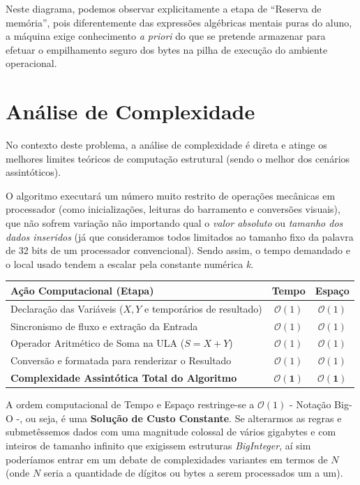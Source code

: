 \documentclass[11pt]{article}
\begin{document}
Neste diagrama, podemos observar explicitamente a etapa de ``Reserva de memória'', pois diferentemente das expressões algébricas mentais puras do aluno, a máquina exige conhecimento \textit{a priori} do que se pretende armazenar para efetuar o empilhamento seguro dos bytes na pilha de execução do ambiente operacional.

\newpage

\section*{Análise de Complexidade}

No contexto deste problema, a análise de complexidade é direta e atinge os melhores limites teóricos de computação estrutural (sendo o melhor dos cenários assintóticos).

O algoritmo executará um número muito restrito de operações mecânicas em processador (como inicializações, leituras do barramento e conversões visuais), que não sofrem variação não importando qual o \textit{valor absoluto} ou \textit{tamanho dos dados inseridos} (já que consideramos todos limitados ao tamanho fixo da palavra de 32 bits de um processador convencional). Sendo assim, o tempo demandado e o local usado tendem a escalar pela constante numérica \textit{k}.

\begin{table}[h]
\centering
\begin{tabularx}{0.85\textwidth}{X c c}
\toprule
\textbf{Ação Computacional (Etapa)} & \textbf{Tempo} & \textbf{Espaço} \\
\midrule
Declaração das Variáveis ($X, Y$ e temporários de resultado) & $\mathcal{O}(1)$ & $\mathcal{O}(1)$ \\
Sincronismo de fluxo e extração da Entrada & $\mathcal{O}(1)$ & $\mathcal{O}(1)$ \\
Operador Aritmético de Soma na ULA ($S = X + Y$) & $\mathcal{O}(1)$ & $\mathcal{O}(1)$ \\
Conversão e formatada para renderizar o Resultado & $\mathcal{O}(1)$ & $\mathcal{O}(1)$ \\
\midrule
\textbf{Complexidade Assintótica Total do Algoritmo} & $\mathbf{\mathcal{O}(1)}$ & $\mathbf{\mathcal{O}(1)}$ \\
\bottomrule
\end{tabularx}
\end{table}

A ordem computacional de Tempo e Espaço restringe-se a $\mathcal{O}(1)$ - Notação Big-O -, ou seja, é uma \textbf{Solução de Custo Constante}. Se alterarmos as regras e submetêssemos dados com uma magnitude colossal de vários gigabytes e com inteiros de tamanho infinito que exigissem estruturas \textit{BigInteger}, aí sim poderíamos entrar em um debate de complexidades variantes em termos de $N$ (onde $N$ seria a quantidade de dígitos ou bytes a serem processados um a um).
\end{document}
